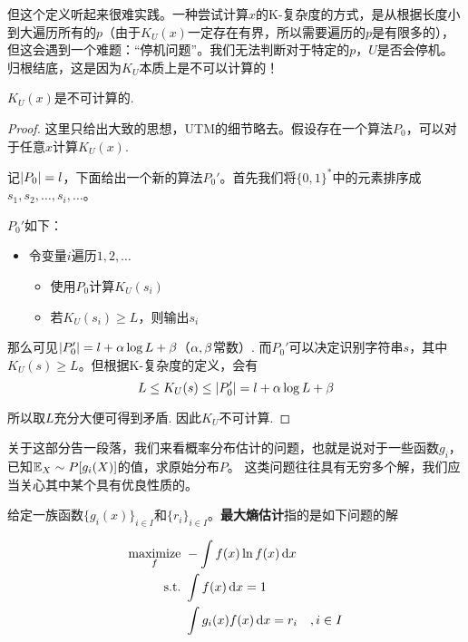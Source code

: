 但这个定义听起来很难实践。一种尝试计算$x$的K-复杂度的方式，是从根据长度小到大遍历所有的$p$（由于$K_U(x)$一定存在有界，所以需要遍历的$p$是有限多的），但这会遇到一个难题：“停机问题”。我们无法判断对于特定的$p$，$U$是否会停机。 归根结底，这是因为$K_U$本质上是不可以计算的！
\begin{theorem}
    $K_U(x)$是不可计算的. 
\end{theorem}
\begin{proof}
    这里只给出大致的思想，UTM的细节略去。假设存在一个算法$P_0$，可以对于任意$x$计算$K_U(x)$. 

    记$\left\vert P_0\right\vert = l$，下面给出一个新的算法$P_0'$。首先我们将$\{0,1\}^*$中的元素排序成$s_1,s_2,\dots,s_i,\dots$。
    
    $P_0'$如下：
    \begin{itemize}
        \item 令变量$i$遍历$1,2,\dots$
        \begin{itemize}
            \item 使用$P_0$计算$K_U(s_i)$
            \item 若$K_U(s_i) \ge L$，则输出$s_i$
        \end{itemize}
    \end{itemize}

    那么可见$\left\vert P_0'\right\vert = l + \alpha \log L + \beta$（$\alpha, \beta$常数）. 而$P_0'$可以决定识别字符串$s$，其中$K_U(s) \ge L$。但根据K-复杂度的定义，会有 
    \[
    L \le K_U(s) \le \left\vert P_0'\right\vert = l + \alpha \log L + \beta
    \]

    所以取$L$充分大便可得到矛盾. 因此$K_U$不可计算.
\end{proof}

关于这部分告一段落，我们来看概率分布估计的问题，也就是说对于一些函数$g_i$，已知$\mathbb{E}_X\sim P [g_i(X)]$的值，求原始分布$P$。 这类问题往往具有无穷多个解，我们应当关心其中某个具有优良性质的。 
    \begin{definition}[最大熵估计]
        给定一族函数$\{g_i(x)\}_{i\in I}$和$\{r_i\}_{i \in I}$。\textbf{最大熵估计}指的是如下问题的解 
        
        \begin{align*}
            \operatorname*{maximize}_{f} \ & -\int f(x) \ln f(x) \mathop{}\!\mathrm{d}x \\
            \text{s.t.} \ & \int f(x) \mathop{}\!\mathrm{d}x = 1 \\
            \ & \int g_i(x)f(x) \mathop{}\!\mathrm{d}x = r_i\quad ,i\in I
        \end{align*}
    \end{definition}

